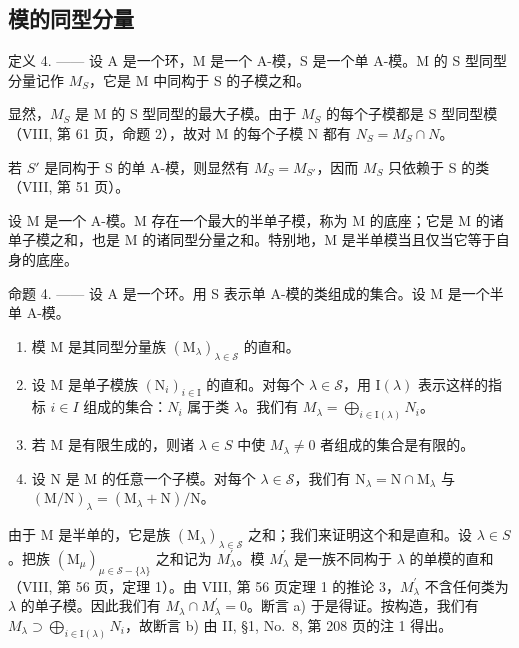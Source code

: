 \subsection{模的同型分量}

定义 4. —— 设 A 是一个环，M 是一个 A-模，S 是一个单 A-模。M 的 S 型同型分量记作 \(M_{S}\)，它是 M 中同构于 S 的子模之和。

显然，\(M_{S}\) 是 M 的 S 型同型的最大子模。由于 \(M_{S}\) 的每个子模都是 S 型同型模（VIII, 第 61 页，命题 2），故对 M 的每个子模 N 都有 \(N_{S} = M_{S} \cap N\)。

若 \(S'\) 是同构于 S 的单 A-模，则显然有 \(M_{S} = M_{S'}\)，因而 \(M_{S}\) 只依赖于 S 的类（VIII, 第 51 页）。

设 M 是一个 A-模。M 存在一个最大的半单子模，称为 M 的底座；它是 M 的诸单子模之和，也是 M 的诸同型分量之和。特别地，M 是半单模当且仅当它等于自身的底座。

命题 4. —— 设 A 是一个环。用 S 表示单 A-模的类组成的集合。设 M 是一个半单 A-模。

\begin{enumerate}
\def\labelenumi{\alph{enumi})}
\item
  模 M 是其同型分量族 \((\mathrm{M}_{\lambda})_{\lambda\in\mathcal{S}}\) 的直和。
\item
  设 M 是单子模族 \((\mathrm{N}_{i})_{i\in\mathrm{I}}\) 的直和。对每个 \(\lambda\in\mathscr{S}\)，用 \(\mathrm{I}(\lambda)\) 表示这样的指标 \(i\in I\) 组成的集合：\(N_{i}\) 属于类 \(\lambda\)。我们有 \(M_{\lambda}=\bigoplus_{i\in\mathrm{I}(\lambda)}N_{i}\)。
\item
  若 M 是有限生成的，则诸 \(\lambda\in S\) 中使 \(M_{\lambda}\neq0\) 者组成的集合是有限的。
\item
  设 \(\mathrm{N}\) 是 \(\mathrm{M}\) 的任意一个子模。对每个 \(\lambda \in \mathcal{S}\)，我们有 \(\mathrm{N}_{\lambda} = \mathrm{N} \cap \mathrm{M}_{\lambda}\) 与 \((\mathrm{M} / \mathrm{N})_{\lambda} = (\mathrm{M}_{\lambda} + \mathrm{N}) / \mathrm{N}\)。
\end{enumerate}

由于 M 是半单的，它是族 \((\mathrm{M}_{\lambda})_{\lambda\in\mathcal{S}}\) 之和；我们来证明这个和是直和。设 \(\lambda\in S\)。把族 \((\mathrm{M}_{\mu})_{\mu\in\mathcal{S}-\{\lambda\}}\) 之和记为 \(M_{\lambda}^{\prime}\)。模 \(M_{\lambda}^{\prime}\) 是一族不同构于 \(\lambda\) 的单模的直和（VIII, 第 56 页，定理 1）。由 VIII, 第 56 页定理 1 的推论 3，\(M_{\lambda}^{\prime}\) 不含任何类为 \(\lambda\) 的单子模。因此我们有 \(M_{\lambda}\cap M_{\lambda}^{\prime}=0\)。断言 a) 于是得证。按构造，我们有 \(M_{\lambda}\supset\bigoplus_{i\in\mathrm{I}(\lambda)}N_{i}\)，故断言 b) 由 II, §1, No.~8, 第 208 页的注 1 得出。

